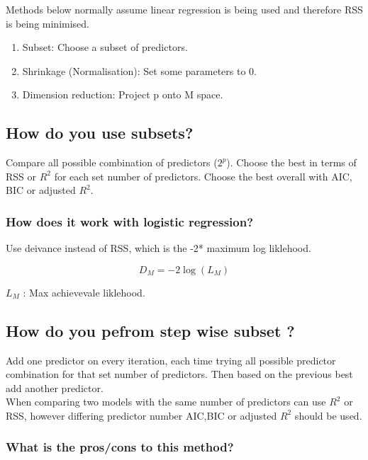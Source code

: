\documentclass[11pt]{scrartcl} %
\begin{document}
Methods below normally assume linear regression is being used and therefore RSS is being minimised.

\begin{enumerate}
	\item Subset: Choose a subset of predictors.
	\item Shrinkage (Normalisation): Set some parameters to 0.
	\item Dimension reduction: Project p onto M space.
\end{enumerate}

\subsection{How do you use subsets?}

Compare all possible combination of predictors (\(2^p\)). 
Choose the best in terms of RSS or \(R^2\) for each set number of predictors.
Choose the best overall with AIC, BIC or adjusted \(R^2\).

\subsubsection{How does it work with logistic regression?}

Use deivance instead of RSS, which is the -2* maximum log liklehood.

\begin{equation}
	D_{M} = -2 \log (L_M)
\end{equation}

\(L_M\) : Max achievevale liklehood.

\subsection{How do you pefrom step wise subset ?}

Add one predictor on every iteration, each time trying all possible predictor combination for that
set number of predictors. Then based on the previous best add another predictor. \\

When comparing two models with the same number of predictors can use \(R^2\) or RSS, however differing
predictor number AIC,BIC or adjusted \(R^2\) should be used.

\subsubsection{What is the pros/cons to this method?}
\end{document}

